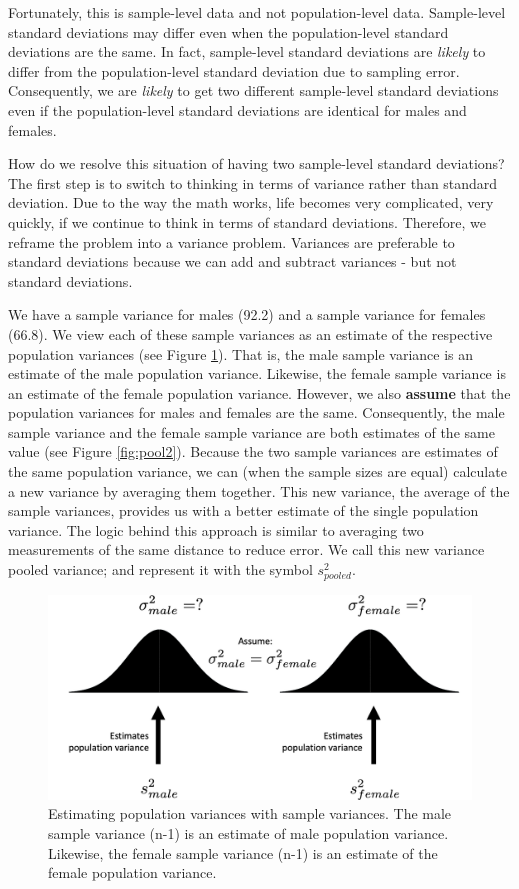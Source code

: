 \documentclass[
]{krantz}
\begin{document}
Fortunately, this is sample-level data and not population-level data. Sample-level standard deviations may differ even when the population-level standard deviations are the same. In fact, sample-level standard deviations are \emph{likely} to differ from the population-level standard deviation due to sampling error. Consequently, we are \emph{likely} to get two different sample-level standard deviations even if the population-level standard deviations are identical for males and females.

How do we resolve this situation of having two sample-level standard deviations? The first step is to switch to thinking in terms of variance rather than standard deviation. Due to the way the math works, life becomes very complicated, very quickly, if we continue to think in terms of standard deviations. Therefore, we reframe the problem into a variance problem. Variances are preferable to standard deviations because we can add and subtract variances - but not standard deviations.

We have a sample variance for males (92.2) and a sample variance for females (66.8). We view each of these sample variances as an estimate of the respective population variances (see Figure \ref{fig:pool1}). That is, the male sample variance is an estimate of the male population variance. Likewise, the female sample variance is an estimate of the female population variance. However, we also \textbf{assume} that the population variances for males and females are the same. Consequently, the male sample variance and the female sample variance are both estimates of the same value (see Figure \ref{fig:pool2}). Because the two sample variances are estimates of the same population variance, we can (when the sample sizes are equal) calculate a new variance by averaging them together. This new variance, the average of the sample variances, provides us with a better estimate of the single population variance. The logic behind this approach is similar to averaging two measurements of the same distance to reduce error. We call this new variance pooled variance; and represent it with the symbol \(s_{pooled}^2\).

\newpage

\begin{figure}
\includegraphics[width=0.8\linewidth]{ch_samples/images/pool1} \caption[Estimating population variances with sample variances]{Estimating population variances with sample variances. The male sample variance (n-1) is an estimate of male population variance. Likewise, the female sample variance (n-1) is an estimate of the female population variance. }\label{fig:pool1}
\end{figure}
\end{document}
